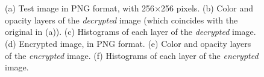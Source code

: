 \begin{figure}[htbp]
 \\
~
\caption{(a) Test image in PNG format, with 256$ \times $256 pixels. (b) Color and opacity layers of the \textit{decrypted} image (which coincides with the original in (a)). (c) Histograms of each layer of the \textit{decrypted} image. (d) Encrypted image, in PNG format. (e) Color and opacity layers of the \textit{encrypted} image. (f) Histograms of each layer of the \textit{encrypted} image.}
\label{fig:testing_hist}
\end{figure}

